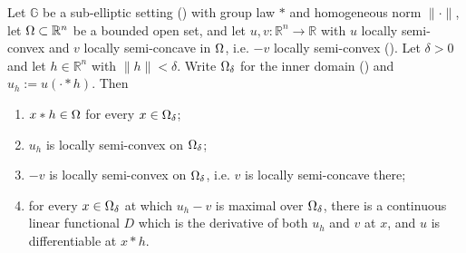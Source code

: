 \begin{lemma}
Let $\mathbb G$ be a sub-elliptic setting () with group law $*$ and
homogeneous norm $\|\cdot\|$, let $\Omega\subset\mathbb R^{n}$ be a bounded open set, and let
$u,v:\mathbb R^{n}\to\mathbb R$ with $u$ locally semi-convex and $v$ locally semi-concave in
$\Omega$, i.e. $-v$ locally semi-convex (). Let $\delta>0$ and let
$h\in\mathbb R^{n}$ with $\|h\|<\delta$. Write $\Omega_\delta$ for the inner domain
() and $u_h:=u(\cdot*h)$. Then
\begin{enumerate}
\item $x*h\in\Omega$ for every $x\in\Omega_\delta$;
\item $u_h$ is locally semi-convex on $\Omega_\delta$;
\item $-v$ is locally semi-convex on $\Omega_\delta$, i.e. $v$ is locally semi-concave there;
\item for every $x\in\Omega_\delta$ at which $u_h-v$ is maximal over $\Omega_\delta$, there is a
  continuous linear functional $D$ which is the derivative of both $u_h$ and $v$ at $x$, and
  $u$ is differentiable at $x*h$.
\end{enumerate}
\end{lemma}
